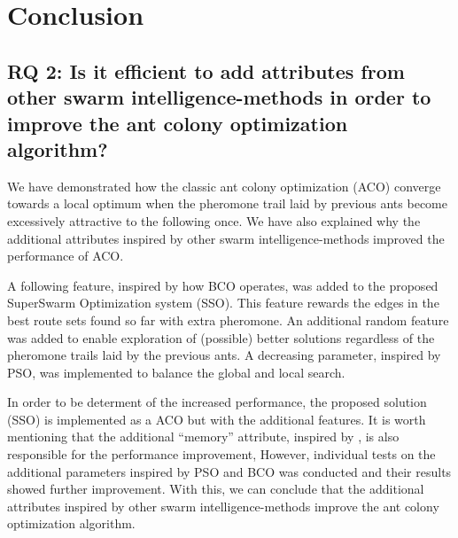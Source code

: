 \section{Conclusion}

\subsection*{RQ 2: Is it efficient to add attributes from other swarm intelligence-methods in order to improve the ant colony optimization algorithm?}

We have demonstrated how the classic ant colony optimization (ACO) converge towards a local optimum when the pheromone trail laid by previous ants become excessively attractive to the following once. We have also explained why the additional attributes inspired by other swarm intelligence-methods improved the performance of ACO. \newline

A following feature, inspired by how BCO operates, was added to the proposed SuperSwarm Optimization system (SSO). This feature rewards the edges in the best route sets found so far with extra pheromone. An additional random feature was added to enable exploration of (possible) better solutions regardless of the pheromone trails laid by the previous ants. A decreasing parameter, inspired by PSO, was implemented to balance the global and local search. \newline


In order to be determent of the increased performance, the proposed solution (SSO) is implemented as a ACO but with the additional features. It is worth mentioning that the additional ``memory'' attribute, inspired by \citet{dorigo96, sedighpour14, poorzahedy11, salehinejad10}, is also responsible for the performance improvement, However, individual tests on the additional parameters inspired by PSO and BCO was conducted and their results showed further improvement. With this, we can conclude that the additional attributes inspired by other swarm intelligence-methods improve the ant colony optimization algorithm. 

